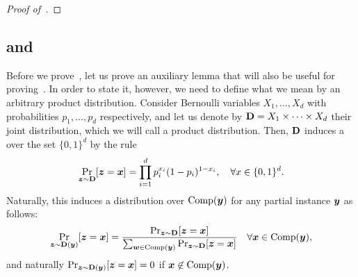 \begin{proof}[Proof of~]
\end{proof}


\subsection{ and }
    Before we prove~, let us prove an auxiliary lemma that will also be useful for proving~.
In order to state it, however, we need to define what we mean by an arbitrary product distribution. Consider Bernoulli variables $X_1, \ldots, X_d$ with probabilities $p_1, \ldots, p_d$ respectively, and let us denote by $\mathbf{D} = X_1 \times \cdots \times X_d$ their joint distribution, which we will call a product distribution. Then, $\mathbf{D}$ induces a over the set $\{0, 1\}^d$ by the rule
\[ 
    \Pr_{{\bm{z}} \sim \mathbf{D}}[{\bm{z}} = {\bm{x}}] = \prod_{i=1}^d p_i^{x_i} (1-p_i)^{1-x_i}, \quad \forall x \in \{0, 1\}^d.
\]
Naturally, this induces a distribution over $\operatorname{Comp}({\bm{y}})$ for any partial instance ${\bm{y}}$ as follows:
\[ 
    \Pr_{{\bm{z}} \sim \mathbf{D}({\bm{y}})}[{\bm{z}} = {\bm{x}}] =
        \frac{\Pr_{{\bm{z}} \sim \mathbf{D}}[{\bm{z}} = {\bm{x}}]}{\sum_{{\bm{w}} \in \operatorname{Comp}({\bm{y}})} \Pr_{{\bm{z}} \sim \mathbf{D}}[{\bm{z}} = {\bm{x}}]} \quad \forall {\bm{x}} \in \operatorname{Comp}({\bm{y}}),
\]
and naturally $\Pr_{{\bm{z}} \sim \mathbf{D}({\bm{y}})}[{\bm{z}} = {\bm{x}}] = 0$ if ${\bm{x}} \not\in \operatorname{Comp}({\bm{y}})$.

